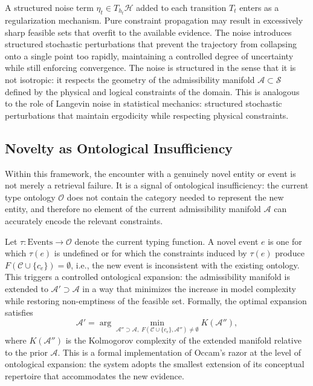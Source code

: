 \documentclass[12pt, oneside]{article}
\begin{document}
A structured noise term $\eta_t \in T_{h_t}\mathcal{H}$ added to each transition $T_t$ enters as a regularization mechanism. Pure constraint propagation may result in excessively sharp feasible sets that overfit to the available evidence. The noise introduces structured stochastic perturbations that prevent the trajectory from collapsing onto a single point too rapidly, maintaining a controlled degree of uncertainty while still enforcing convergence. The noise is structured in the sense that it is not isotropic: it respects the geometry of the admissibility manifold $\mathcal{A} \subset \mathcal{S}$ defined by the physical and logical constraints of the domain. This is analogous to the role of Langevin noise in statistical mechanics: structured stochastic perturbations that maintain ergodicity while respecting physical constraints.

\subsection{Novelty as Ontological Insufficiency}

Within this framework, the encounter with a genuinely novel entity or event is not merely a retrieval failure. It is a signal of ontological insufficiency: the current type ontology $\mathcal{O}$ does not contain the category needed to represent the new entity, and therefore no element of the current admissibility manifold $\mathcal{A}$ can accurately encode the relevant constraints.

Let $\tau : \text{Events} \to \mathcal{O}$ denote the current typing function. A novel event $e$ is one for which $\tau(e)$ is undefined or for which the constraints induced by $\tau(e)$ produce $F(\mathcal{C} \cup \{c_e\}) = \emptyset$, i.e., the new event is inconsistent with the existing ontology. This triggers a controlled ontological expansion: the admissibility manifold is extended to $\mathcal{A}' \supset \mathcal{A}$ in a way that minimizes the increase in model complexity while restoring non-emptiness of the feasible set. Formally, the optimal expansion satisfies
\begin{equation}
  \mathcal{A}' = \arg\min_{\mathcal{A}'' \supset \mathcal{A},\; F(\mathcal{C} \cup \{c_e\}, \mathcal{A}'') \neq \emptyset} K(\mathcal{A}''),
\end{equation}
where $K(\mathcal{A}'')$ is the Kolmogorov complexity of the extended manifold relative to the prior $\mathcal{A}$. This is a formal implementation of Occam's razor at the level of ontological expansion: the system adopts the smallest extension of its conceptual repertoire that accommodates the new evidence.
\end{document}
